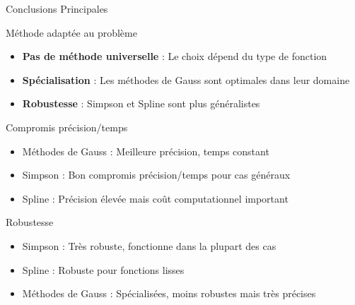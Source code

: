 \documentclass[aspectratio=169,11pt]{beamer}
\begin{document}
\begin{frame}{Conclusions Principales}
\vspace{-0.2cm}
\begin{block}{Méthode adaptée au problème}
\small
\begin{itemize}
\item \textbf{Pas de méthode universelle} : Le choix dépend du type de fonction
\item \textbf{Spécialisation} : Les méthodes de Gauss sont optimales dans leur domaine
\item \textbf{Robustesse} : Simpson et Spline sont plus généralistes
\end{itemize}
\end{block}

\vspace{-0.15cm}
\begin{block}{Compromis précision/temps}
\small
\begin{itemize}
\item Méthodes de Gauss : Meilleure précision, temps constant
\item Simpson : Bon compromis précision/temps pour cas généraux
\item Spline : Précision élevée mais coût computationnel important
\end{itemize}
\end{block}

\vspace{-0.15cm}
\begin{block}{Robustesse}
\small
\begin{itemize}
\item Simpson : Très robuste, fonctionne dans la plupart des cas
\item Spline : Robuste pour fonctions lisses
\item Méthodes de Gauss : Spécialisées, moins robustes mais très précises
\end{itemize}
\end{block}
\end{frame}
\end{document}
